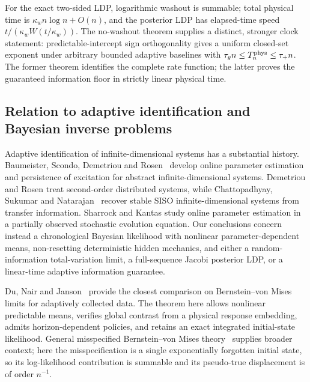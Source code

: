 For the exact two-sided LDP, logarithmic washout is summable; total physical
time is \(\kappa_wn\log n+O(n)\), and the posterior LDP has elapsed-time speed
\(t/(\kappa_wW(t/\kappa_w))\).  The no-washout theorem supplies a distinct,
stronger clock statement: predictable-intercept sign orthogonality gives a
uniform closed-set exponent under arbitrary bounded adaptive baselines with
\(\tau_gn\le T_n^{\rm phys}\le\tau_+n\).  The former theorem identifies the
complete rate function; the latter proves the guaranteed information floor in
strictly linear physical time.

\subsection{Relation to adaptive identification and Bayesian inverse problems}
\label{sec:literature}

Adaptive identification of infinite-dimensional systems has a substantial
history.  Baumeister, Scondo, Demetriou and Rosen~\cite{Baumeister1997} develop
online parameter estimation and persistence of excitation for abstract
infinite-dimensional systems.  Demetriou and Rosen
\cite{DemetriouRosen1994Inverse,DemetriouRosen1994PE} treat second-order
distributed systems, while Chattopadhyay, Sukumar and
Natarajan~\cite{Chattopadhyay2025} recover stable SISO infinite-dimensional
systems from transfer information.  Sharrock and Kantas
\cite{SharrockKantas2022} study online parameter estimation in a partially
observed stochastic evolution equation.  Our conclusions concern instead a
chronological Bayesian likelihood with nonlinear parameter-dependent means,
non-resetting deterministic hidden mechanics, and either a random-information
total-variation limit, a full-sequence Jacobi posterior LDP, or a linear-time
adaptive information guarantee.

Du, Nair and Janson~\cite{DuNairJanson2025} provide the closest comparison on
Bernstein--von Mises limits for adaptively collected data.  The theorem here
allows nonlinear predictable means, verifies global contrast from a physical
response embedding, admits horizon-dependent policies, and retains an exact
integrated initial-state likelihood.  General misspecified Bernstein--von
Mises theory~\cite{KleijnVanDerVaart2012} supplies broader context; here the
misspecification is a single exponentially forgotten initial state, so its
log-likelihood contribution is summable and its pseudo-true displacement is
of order \(n^{-1}\).

